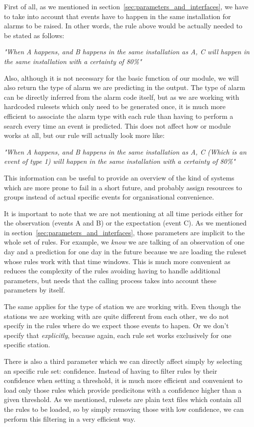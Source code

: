 First of all, as we mentioned in section~\ref{sec:parameters_and_interfaces}, we have to take into account that events have to happen in the same installation for alarms to be raised. In other words, the rule above would be actually needed to be stated as follows:

\emph{"When A happens, and B happens in the same installation as A, C will happen in the same installation with a certainty of 80\%"}

Also, although it is not necessary for the basic function of our module, we will also return the type of alarm we are predicting in the output. The type of alarm can be directly inferred from the alarm code itself, but as we are working with hardcoded rulesets which only need to be generated once, it is much more efficient to associate the alarm type with each rule than having to perform a search every time an event is predicted. This does not affect how or module works at all, but our rule will actually look more like:

\emph{"When A happens, and B happens in the same installation as A, C (Which is an event of type 1) will happen in the same installation with a certainty of 80\%"}

This information can be useful to provide an overview of the kind of systems which are more prone to fail in a short future, and probably assign resources to groups instead of actual specific events for organisational convenience.

It is important to note that we are not mentioning at all time periods either for the observation (events A and B) or the expectation (event C). As we mentioned in section~\ref{sec:parameters_and_interfaces}, those parameters are implicit to the whole set of rules. For example, we \emph{know} we are talking of an observation of one day and a prediction for one day in the future because we are loading the ruleset whose rules work with that time windows. This is much more convenient as reduces the complexity of the rules avoiding having to handle additional parameters, but needs that the calling process takes into account these parameters by itself.

The same applies for the type of station we are working with. Even though the stations we are working with are quite different from each other, we do not specify in the rules where do we expect those events to hapen. Or we don't specify that \emph{explicitly}, because again, each rule set works exclusively for one specific station.

There is also a third parameter which we can directly affect simply by selecting an specific rule set: confidence. Instead of having to filter rules by their confidence when setting a threshold, it is much more efficient and convenient to load only those rules which provide predicitons with a confidence higher than a given threshold. As we mentioned, rulesets are plain text files which contain all the rules to be loaded, so by simply removing those with low confidence, we can perform this filtering in a very efficient way.

